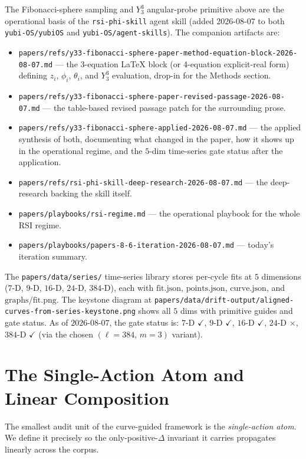 \documentclass[11pt,a4paper]{article}
\theoremstyle{plain}
\theoremstyle{remark}
\theoremstyle{plain}
\begin{document}
The Fibonacci-sphere sampling and $Y_3^3$ angular-probe primitive above are the operational basis of the \texttt{rsi-phi-skill} agent skill (added 2026-08-07 to both \texttt{yubi-OS/yubiOS} and \texttt{yubi-OS/agent-skills}). The companion artifacts are:
\begin{itemize}
\item \texttt{papers/refs/y33-fibonacci-sphere-paper-method-equation-block-2026-08-07.md} --- the 3-equation LaTeX block (or 4-equation explicit-real form) defining $z_i$, $\phi_i$, $\theta_i$, and $Y_3^3$ evaluation, drop-in for the Methods section.
\item \texttt{papers/refs/y33-fibonacci-sphere-paper-revised-passage-2026-08-07.md} --- the table-based revised passage patch for the surrounding prose.
\item \texttt{papers/refs/y33-fibonacci-sphere-applied-2026-08-07.md} --- the applied synthesis of both, documenting what changed in the paper, how it shows up in the operational regime, and the $5$-dim time-series gate status after the application.
\item \texttt{papers/refs/rsi-phi-skill-deep-research-2026-08-07.md} --- the deep-research backing the skill itself.
\item \texttt{papers/playbooks/rsi-regime.md} --- the operational playbook for the whole RSI regime.
\item \texttt{papers/playbooks/papers-8-6-iteration-2026-08-07.md} --- today's iteration summary.
\end{itemize}
The \texttt{papers/data/series/} time-series library stores per-cycle fits at $5$ dimensions ($7$-D, $9$-D, $16$-D, $24$-D, $384$-D), each with $\mathrm{fit.json}$, $\mathrm{points.json}$, $\mathrm{curve.json}$, and $\mathrm{graphs/fit.png}$. The keystone diagram at \texttt{papers/data/drift-output/aligned-curves-from-series-keystone.png} shows all $5$ dims with primitive guides and gate status. As of $2026$-$08$-$07$, the gate status is: $7$-D $\checkmark$, $9$-D $\checkmark$, $16$-D $\checkmark$, $24$-D $\boldsymbol{\times}$, $384$-D $\checkmark$ (via the chosen $(\ell{=}384,\,m{=}3)$ variant).

\section{The Single-Action Atom and Linear Composition}
\label{sec:atom}

The smallest audit unit of the curve-guided framework is the \emph{single-action atom}. We define it precisely so the only-positive-$\Delta$ invariant it carries propagates linearly across the corpus.
\end{document}
